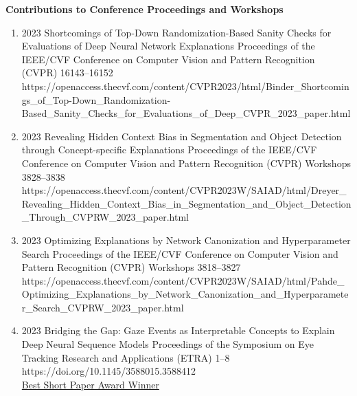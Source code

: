 \headedsection %
{\bf Contributions to Conference Proceedings and Workshops}{}
{
    \begin{enumerate}
        

        \item {}
                            {2023}
                            {Shortcomings of Top-Down Randomization-Based Sanity Checks for Evaluations of Deep Neural Network Explanations}
                            {Proceedings of the IEEE/CVF Conference on Computer Vision and Pattern Recognition (CVPR)}
                            {16143--16152}
                            {https://openaccess.thecvf.com/content/CVPR2023/html/Binder_Shortcomings_of_Top-Down_Randomization-Based_Sanity_Checks_for_Evaluations_of_Deep_CVPR_2023_paper.html}

        \item {}
                            {2023}
                            {Revealing Hidden Context Bias in Segmentation and Object Detection through Concept-specific Explanations}
                            {Proceedings of the IEEE/CVF Conference on Computer Vision and Pattern Recognition (CVPR) Workshops}
                            {3828--3838}
                            {https://openaccess.thecvf.com/content/CVPR2023W/SAIAD/html/Dreyer_Revealing_Hidden_Context_Bias_in_Segmentation_and_Object_Detection_Through_CVPRW_2023_paper.html}

        \item {}
                            {2023}
                            {Optimizing Explanations by Network Canonization and Hyperparameter Search}
                            {Proceedings of the IEEE/CVF Conference on Computer Vision and Pattern Recognition (CVPR) Workshops}
                            {3818--3827}
                            {https://openaccess.thecvf.com/content/CVPR2023W/SAIAD/html/Pahde_Optimizing_Explanations_by_Network_Canonization_and_Hyperparameter_Search_CVPRW_2023_paper.html} 
                            

        \item {}
                            {2023}
                            {Bridging the Gap: Gaze Events as Interpretable Concepts to Explain Deep Neural Sequence Models}
                            {Proceedings of the Symposium on Eye Tracking Research and Applications (ETRA)}
                            {1--8}
                            {https://doi.org/10.1145/3588015.3588412} 
                            {\\\href{https://datacloud.hhi.fraunhofer.de/s/YExo6qyWDxksRof}{Best Short Paper Award Winner}}


\end{enumerate}}
